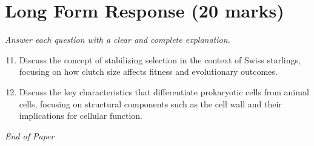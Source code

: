 \documentclass[12pt]{article}
\begin{document}
\section*{Long Form Response (20 marks)}
\textit{Answer each question with a clear and complete explanation.}
\begin{enumerate}[label=\arabic*.]
\setcounter{enumi}{10}
\item Discuss the concept of stabilizing selection in the context of Swiss starlings, focusing
on how clutch size affects fitness and evolutionary outcomes.
\item Discuss the key characteristics that differentiate prokaryotic cells from animal cells,
focusing on structural components such as the cell wall and their implications for
cellular function.
\end{enumerate}

\vfill
\noindent\textit{End of Paper}
\end{document}

